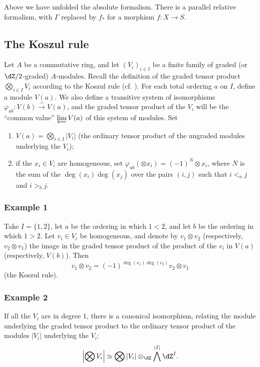 \documentclass[12pt,oneside,english]{smfbook}
\newcommand{\iso}{\xrightarrow\sim}
\begin{document}
Above we have unfolded the absolute formalism. There is a parallel relative formalism, with $\Gamma$ replaced by $f_*$ for a morphism $f:X\to S$.

\subsection{The Koszul rule}\label{IV:1-3}

Let $A$ be a commutative ring, and let $(V_i)_{i\in I}$ be a finite family of graded (or $\dZ/2$-graded) $A$-modules. Recall the definition of the graded tensor product $\bigotimes_{i\in I}V_i$ according to the Koszul rule (cf. \cite[XVII 1.1]{sga4}). For each total ordering $a$ on $I$, define a module $V(a)$. We also define a transitive system of isomorphisms $\varphi_{ab}:V(b)\iso V(a)$, and the graded tensor product of the $V_i$ will be the ``common value'' $\varprojlim V(a)$ of this system of modules. Set
\begin{enumerate}[\indent a)]
  \item $V(a)=\bigotimes_{i\in I}|V_i|$ (the ordinary tensor product of the ungraded modules underlying the $V_i$);
  \item if the $x_i\in V_i$ are homogeneous, set $\varphi_{ab}(\otimes x_i)=(-1)^N\otimes x_i$, where $N$ is the sum of the $\deg(x_i)\deg(x_j)$ over the pairs $(i,j)$ such that $i<_a j$ and $i>_b j$.
\end{enumerate}

\subsubsection*{Example 1}

Take $I=\{1,2\}$, let $a$ be the ordering in which $1<2$, and let $b$ be the ordering in which $1>2$. Let $v_i\in V_i$ be homogeneous, and denote by $v_1\otimes v_2$ (respectively, $v_2\otimes v_1$) the image in the graded tensor product of the product of the $v_i$ in $V(a)$ (respectively, $V(b)$). Then
\[
  v_1\otimes v_2 = (-1)^{\deg(v_1)\deg(v_2)} v_2\otimes v_1
\]
(the Koszul rule).

\subsubsection*{Example 2}

If all the $V_i$ are in degree $1$, there is a canonical isomorphism, relating the module underlying the graded tensor product to the ordinary tensor product of the modules $|V_i|$ underlying the $V_i$:
\[
  \left|\bigotimes V_i\right| \simeq \bigotimes |V_i|\otimes_{\dZ}\bigwedge^{|I|}\dZ^I \text{.}
\]
\end{document}
